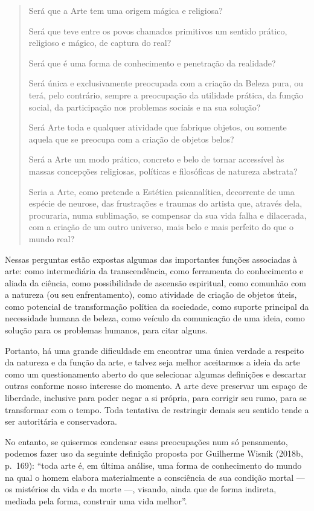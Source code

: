 \begin{quote}
Será que a Arte tem uma origem mágica e religiosa?

Será que teve entre os povos chamados primitivos um sentido prático,
religioso e mágico, de captura do real?

Será que é uma forma de conhecimento e penetração da realidade?

Será única e exclusivamente preocupada com a criação da Beleza pura, ou
terá, pelo contrário, sempre a preocupação da utilidade prática, da
função social, da participação nos problemas sociais e na sua solução?

Será Arte toda e qualquer atividade que fabrique objetos, ou somente
aquela que se preocupa com a criação de objetos belos?

Será a Arte um modo prático, concreto e belo de tornar accessível às
massas concepções religiosas, políticas e filosóficas de natureza
abstrata?

Seria a Arte, como pretende a Estética psicanalítica, decorrente de uma
espécie de neurose, das frustrações e traumas do artista que, através
dela, procuraria, numa sublimação, se compensar da sua vida falha e
dilacerada, com a criação de um outro universo, mais belo e mais
perfeito do que o mundo real?
\end{quote}

Nessas perguntas estão expostas algumas das importantes funções associadas à
arte: como intermediária da transcendência, como ferramenta do
conhecimento e aliada da ciência, como possibilidade de ascensão
espiritual, como comunhão com a natureza (ou seu enfrentamento), como
atividade de criação de objetos úteis, como potencial de transformação
política da sociedade, como suporte principal da necessidade humana de
beleza, como veículo da comunicação de uma ideia, como solução para os
problemas humanos, para citar alguns.

Portanto, há uma grande dificuldade em encontrar uma única verdade a
respeito da natureza e da função da arte, e talvez seja melhor
aceitarmos a ideia da arte como um questionamento aberto do que
selecionar algumas definições e descartar outras conforme nosso
interesse do momento. A arte deve preservar um espaço de liberdade,
inclusive para poder negar a si própria, para corrigir seu rumo, para se
transformar com o tempo. Toda tentativa de restringir demais seu sentido
tende a ser autoritária e conservadora.

No entanto, se quisermos condensar essas preocupações num só pensamento,
podemos fazer uso da seguinte definição proposta por Guilherme Wisnik
(2018b, p.~169): ``toda arte é, em última análise, uma forma de
conhecimento do mundo na qual o homem elabora materialmente a
consciência de sua condição mortal --- os mistérios da vida e da morte
---, visando, ainda que de forma indireta, mediada pela forma, construir
uma vida melhor''.

